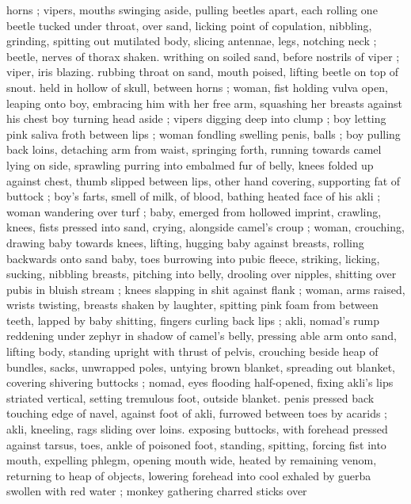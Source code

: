 horns ; vipers, mouths swinging aside, pulling beetles apart, each 
rolling one beetle tucked under throat, over sand, licking point of 
copulation, nibbling, grinding, spitting out mutilated body, slicing 
antennae, legs, notching neck ; beetle, nerves of thorax shaken. 
writhing on soiled sand, before nostrils of viper ; viper, iris blazing. 
rubbing throat on sand, mouth poised, lifting beetle on top of snout. 
held in hollow of skull, between horns ; woman, fist holding vulva 
open, leaping onto boy, embracing him with her free arm, squashing 
her breasts against his chest {\col} boy turning head aside ; vipers 
digging deep into clump ; boy letting pink saliva froth between lips ; 
woman fondling swelling penis, balls ; boy pulling back loins, 
detaching arm from waist, springing forth, running towards camel 
lying on side, sprawling purring into embalmed fur of belly, knees 
folded up against chest, thumb slipped between lips, other hand 
covering, supporting fat of buttock ; boy's farts, smell of milk, of 
blood, bathing heated face of his akli ; woman wandering over turf ; 
baby, emerged from hollowed imprint, crawling, knees, fists pressed 
into sand, crying, alongside camel's croup ; woman, crouching, 
drawing baby towards knees, lifting, hugging baby against breasts, 
rolling backwards onto sand {\col} baby, toes burrowing into pubic fleece, 
striking, licking, sucking, nibbling breasts, pitching into belly, 
drooling over nipples, shitting over pubis in bluish stream ; knees 
slapping in shit against flank ; woman, arms raised, wrists twisting, 
breasts shaken by laughter, spitting pink foam from between teeth, 
lapped by baby shitting, fingers curling back lips ; akli, nomad's 
rump reddening under zephyr in shadow of camel's belly, pressing 
able arm onto sand, lifting body, standing upright with thrust of 
pelvis, crouching beside heap of bundles, sacks, unwrapped poles, 
untying brown blanket, spreading out blanket, covering shivering 
buttocks ; nomad, eyes flooding half-opened, fixing akli's lips 
striated vertical, setting tremulous foot, outside blanket. penis 
pressed back touching edge of navel, against foot of akli, furrowed 
between toes by acarids ; akli, kneeling, rags sliding over loins. 
exposing buttocks, with forehead pressed against tarsus, toes, ankle 
of poisoned foot, standing, spitting, forcing fist into mouth, expelling 
phlegm, opening mouth wide, heated by remaining venom, returning 
to heap of objects, lowering forehead into cool exhaled by guerba 
swollen with red water ; monkey gathering charred sticks over 
